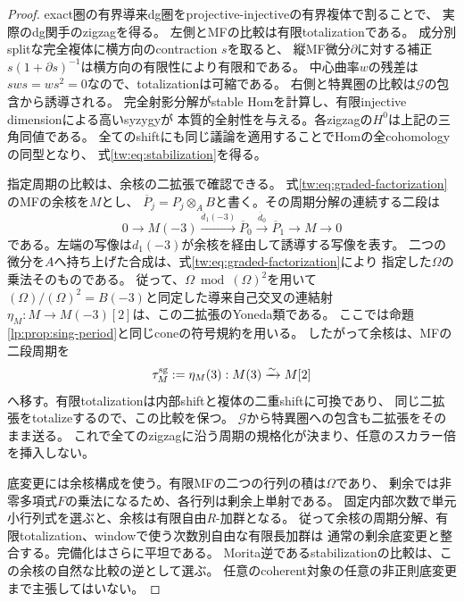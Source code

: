 \begin{proof}
exact圏の有界導来dg圏をprojective-injectiveの有界複体で割ることで、
実際のdg関手のzigzagを得る。
左側とMFの比較は有限totalizationである。
成分別splitな完全複体に横方向のcontraction $s$を取ると、
縦MF微分$\partial$に対する補正$s(1+\partial s)^{-1}$は横方向の有限性により有限和である。
中心曲率$w$の残差は$sws=ws^2=0$なので、totalizationは可縮である。
右側と特異圏の比較は$\mathcal G$の包含から誘導される。
完全射影分解がstable Homを計算し、有限injective dimensionによる高いsyzygyが
本質的全射性を与える。各zigzagの$H^0$は上記の三角同値である。
全てのshiftにも同じ議論を適用することでHomの全cohomologyの同型となり、
式\eqref{tw:eq:stabilization}を得る。

指定周期の比較は、余核の二拡張で確認できる。
式\eqref{tw:eq:graded-factorization}のMFの余核を$M$とし、
$\overline P_j=P_j\otimes_A B$と書く。その周期分解の連続する二段は
\begin{equation}\label{tw:eq:period-extension}
 0\longrightarrow M(-3)\xrightarrow{\overline d_1(-3)}
 \overline P_0\xrightarrow{\overline d_0}\overline P_1
 \longrightarrow M\longrightarrow0
\end{equation}
である。左端の写像は$d_1(-3)$が余核を経由して誘導する写像を表す。
二つの微分を$A$へ持ち上げた合成は、式\eqref{tw:eq:graded-factorization}により
指定した$\Omega$の乗法そのものである。
従って、$\Omega\bmod(\Omega)^2$を用いて
$(\Omega)/(\Omega)^2=B(-3)$と同定した導来自己交叉の連結射
$\eta_M:M\to M(-3)[2]$は、この二拡張のYoneda類である。
ここでは命題\ref{lp:prop:sing-period}と同じconeの符号規約を用いる。
したがって余核は、MFの二段周期を
\begin{equation}\label{tw:eq:specified-period}
 \tau_M^{\rm sg}:=\eta_M(3):M(3)\xrightarrow{\sim}M[2]
\end{equation}
へ移す。有限totalizationは内部shiftと複体の二重shiftに可換であり、
同じ二拡張をtotalizeするので、この比較を保つ。
$\mathcal G$から特異圏への包含も二拡張をそのまま送る。
これで全てのzigzagに沿う周期の規格化が決まり、任意のスカラー倍を挿入しない。

底変更には余核構成を使う。有限MFの二つの行列の積は$\Omega$であり、
剰余では非零多項式$F$の乗法になるため、各行列は剰余上単射である。
固定内部次数で単元小行列式を選ぶと、余核は有限自由$R$-加群となる。
従って余核の周期分解、有限totalization、windowで使う次数別自由な有限長加群は
通常の剰余底変更と整合する。完備化はさらに平坦である。
Morita逆であるstabilizationの比較は、この余核の自然な比較の逆として選ぶ。
任意のcoherent対象の任意の非正則底変更まで主張してはいない。
\end{proof}

